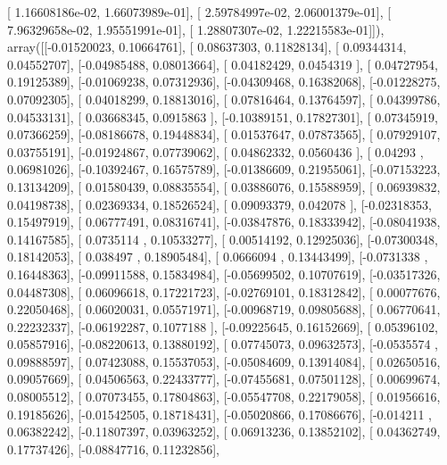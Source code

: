 \documentclass{article}
\begin{document}
       [  1.16608186e-02,   1.66073989e-01],
       [  2.59784997e-02,   2.06001379e-01],
       [  7.96329658e-02,   1.95551991e-01],
       [  1.28807307e-02,   1.22215583e-01]]), array([[-0.01520023,  0.10664761],
       [ 0.08637303,  0.11828134],
       [ 0.09344314,  0.04552707],
       [-0.04985488,  0.08013664],
       [ 0.04182429,  0.0454319 ],
       [ 0.04727954,  0.19125389],
       [-0.01069238,  0.07312936],
       [-0.04309468,  0.16382068],
       [-0.01228275,  0.07092305],
       [ 0.04018299,  0.18813016],
       [ 0.07816464,  0.13764597],
       [ 0.04399786,  0.04533131],
       [ 0.03668345,  0.0915863 ],
       [-0.10389151,  0.17827301],
       [ 0.07345919,  0.07366259],
       [-0.08186678,  0.19448834],
       [ 0.01537647,  0.07873565],
       [ 0.07929107,  0.03755191],
       [-0.01924867,  0.07739062],
       [ 0.04862332,  0.0560436 ],
       [ 0.04293   ,  0.06981026],
       [-0.10392467,  0.16575789],
       [-0.01386609,  0.21955061],
       [-0.07153223,  0.13134209],
       [ 0.01580439,  0.08835554],
       [ 0.03886076,  0.15588959],
       [ 0.06939832,  0.04198738],
       [ 0.02369334,  0.18526524],
       [ 0.09093379,  0.042078  ],
       [-0.02318353,  0.15497919],
       [ 0.06777491,  0.08316741],
       [-0.03847876,  0.18333942],
       [-0.08041938,  0.14167585],
       [ 0.0735114 ,  0.10533277],
       [ 0.00514192,  0.12925036],
       [-0.07300348,  0.18142053],
       [ 0.038497  ,  0.18905484],
       [ 0.0666094 ,  0.13443499],
       [-0.0731338 ,  0.16448363],
       [-0.09911588,  0.15834984],
       [-0.05699502,  0.10707619],
       [-0.03517326,  0.04487308],
       [ 0.06096618,  0.17221723],
       [-0.02769101,  0.18312842],
       [ 0.00077676,  0.22050468],
       [ 0.06020031,  0.05571971],
       [-0.00968719,  0.09805688],
       [ 0.06770641,  0.22232337],
       [-0.06192287,  0.1077188 ],
       [-0.09225645,  0.16152669],
       [ 0.05396102,  0.05857916],
       [-0.08220613,  0.13880192],
       [ 0.07745073,  0.09632573],
       [-0.0535574 ,  0.09888597],
       [ 0.07423088,  0.15537053],
       [-0.05084609,  0.13914084],
       [ 0.02650516,  0.09057669],
       [ 0.04506563,  0.22433777],
       [-0.07455681,  0.07501128],
       [ 0.00699674,  0.08005512],
       [ 0.07073455,  0.17804863],
       [-0.05547708,  0.22179058],
       [ 0.01956616,  0.19185626],
       [-0.01542505,  0.18718431],
       [-0.05020866,  0.17086676],
       [-0.014211  ,  0.06382242],
       [-0.11807397,  0.03963252],
       [ 0.06913236,  0.13852102],
       [ 0.04362749,  0.17737426],
       [-0.08847716,  0.11232856],
\end{document}
